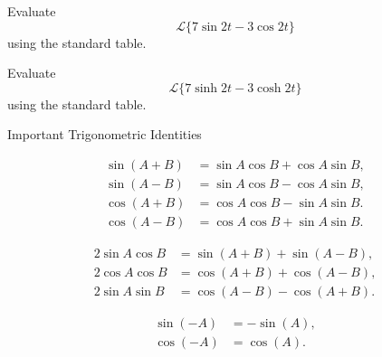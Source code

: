 \documentclass[12pt, a4paper]{article}
\begin{document}
\clearpage

\begin{problem}
	Evaluate \[\mathcal{L}\{7\sin 2t-3\cos 2t\}\] using the standard table.
\end{problem}

\clearpage

\begin{problem}
	Evaluate \[\mathcal{L}\{7\sinh 2t-3\cosh 2t\}\] using the standard table.
\end{problem}

\clearpage

\begin{heading}
	Important Trigonometric Identities
\end{heading}

\vspace{10pt}

\begin{definition}
	\begin{align*}
		\sin(A + B) &= \sin A \cos B + \cos A \sin B, \\
		\sin(A - B) &= \sin A \cos B - \cos A \sin B, \\
		\cos(A + B) &= \cos A \cos B - \sin A \sin B.\\
		\cos(A - B) &= \cos A \cos B + \sin A \sin B.
	\end{align*}
\end{definition}

\vspace{10pt}

\begin{definition}
	\begin{align*}
		2 \sin A \cos B &= \sin(A+B) + \sin(A-B), \\
		2 \cos A \cos B &= \cos(A+B) + \cos(A-B), \\
		2 \sin A \sin B &= \cos(A-B) - \cos(A+B).
	\end{align*}
\end{definition}

\vspace{10pt}

\begin{definition}
	\begin{align*}
		\sin(-A) &= -\sin(A), \\
		\cos(-A) &= \cos(A).
	\end{align*}
\end{definition}

\clearpage
\end{document}
